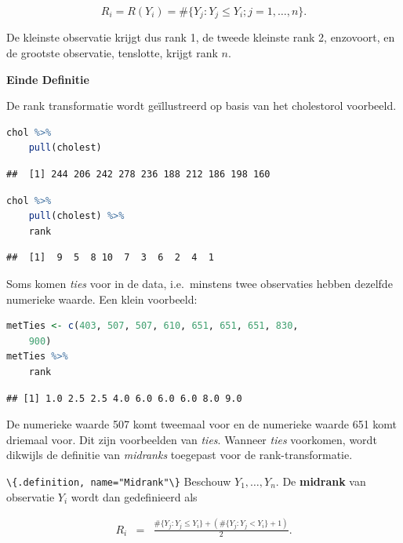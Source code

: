 \documentclass[
  12pt,dutch,coursenotes]{book}
\newcommand{\passthrough}[1]{#1}
\begin{document}
\begin{equation*}
  R_i=R(Y_i) = \#\{Y_j: Y_j\leq Y_i; j=1,\ldots, n\}.
\end{equation*}

De kleinste observatie krijgt dus rank 1, de tweede kleinste rank 2, enzovoort, en de grootste observatie,
tenslotte, krijgt rank \(n\).

\textbf{Einde Definitie}

De rank transformatie wordt geïllustreerd op basis van het cholestorol voorbeeld.

\begin{lstlisting}[language=R]
chol %>%
    pull(cholest)
\end{lstlisting}

\begin{lstlisting}
##  [1] 244 206 242 278 236 188 212 186 198 160
\end{lstlisting}

\begin{lstlisting}[language=R]
chol %>%
    pull(cholest) %>%
    rank
\end{lstlisting}

\begin{lstlisting}
##  [1]  9  5  8 10  7  3  6  2  4  1
\end{lstlisting}

Soms komen \emph{ties} voor in de data, i.e.~minstens twee observaties hebben dezelfde numerieke waarde. Een klein voorbeeld:

\begin{lstlisting}[language=R]
metTies <- c(403, 507, 507, 610, 651, 651, 651, 830,
    900)
metTies %>%
    rank
\end{lstlisting}

\begin{lstlisting}
## [1] 1.0 2.5 2.5 4.0 6.0 6.0 6.0 8.0 9.0
\end{lstlisting}

De numerieke waarde 507 komt tweemaal voor en de numerieke waarde 651 komt driemaal voor. Dit zijn voorbeelden van \emph{ties}.
Wanneer \emph{ties} voorkomen, wordt dikwijls de definitie van \emph{midranks} toegepast voor de rank-transformatie.

\passthrough{\lstinline!\{.definition, name="Midrank"\}!}
Beschouw \(Y_1, \ldots, Y_n\).
De \textbf{midrank} van observatie \(Y_i\) wordt dan
gedefinieerd als

\begin{eqnarray*}
  R_i &=& \frac{ \#\{Y_j: Y_j\leq Y_i\} + ( \#\{Y_j: Y_j < Y_i\} +1)}{2}.
\end{eqnarray*}
\end{document}

